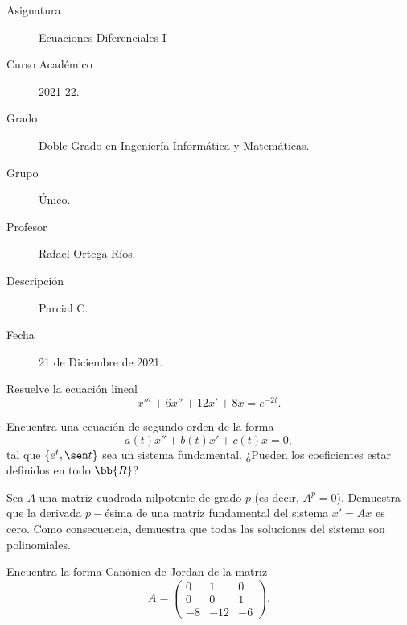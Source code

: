 \documentclass[12pt]{article}
\begin{document}

    
    

    \begin{description}
        \item[Asignatura] Ecuaciones Diferenciales I
        \item[Curso Académico] 2021-22.
        \item[Grado] Doble Grado en Ingeniería Informática y Matemáticas.
        \item[Grupo] Único.
        \item[Profesor] Rafael Ortega Ríos.
        \item[Descripción] Parcial C.
        \item[Fecha] 21 de Diciembre de 2021.
    \end{description}
    \newpage

    \begin{ejercicio}
        Resuelve la ecuación lineal
        \begin{equation*}
            x'''+6x''+12x'+8x=e^{-2t}.
        \end{equation*}
    \end{ejercicio}

    \begin{ejercicio}
        Encuentra una ecuación de segundo orden de la forma
        \begin{equation*}
            a(t)x''+b(t)x'+c(t)x=0,
        \end{equation*}
        tal que $\{e^t,\sen t\}$ sea un sistema fundamental. ¿Pueden los coeficientes estar definidos en todo $\bb{R}$?
    \end{ejercicio}

    \begin{ejercicio}
        Sea $A$ una matriz cuadrada nilpotente de grado $p$ (es decir, $A^p=0$). Demuestra que la derivada $p-$ésima de una matriz fundamental del sistema $x'=Ax$ es cero. Como consecuencia, demuestra que todas las soluciones del sistema son polinomiales.
    \end{ejercicio}

    \begin{ejercicio}
    Encuentra la forma Canónica de Jordan de la matriz
    \begin{equation*}
        A=\begin{pmatrix}
            0 & 1 & 0\\
            0 & 0 & 1\\
            -8 & -12 & -6
        \end{pmatrix}.
    \end{equation*}
    \end{ejercicio}
\end{document}
